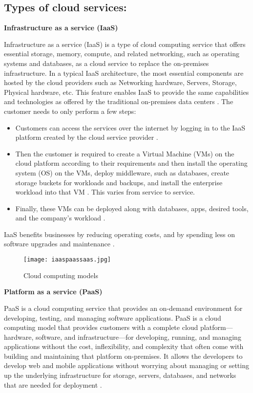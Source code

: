 \subsection{Types of cloud services:}
\textbf{Infrastructure as a service (IaaS)}
\par Infrastructure as a service (IaaS) is a type of cloud computing service that offers essential storage, memory, compute, and related networking, such as
operating systems and databases, as a cloud service to replace the on-premises infrastructure. In a typical IaaS
architecture, the most essential components are hosted by the cloud providers such as Networking hardware, Servers, Storage, Physical hardware, etc. This feature enables IaaS to provide the same capabilities and technologies as offered by the traditional on-premises data centers \cite{9}. The customer needs to only perform a few steps:
\begin{itemize}
    \item Customers can access the services over the internet by logging in to the IaaS platform created by the cloud
    service provider \cite{15}.
\end{itemize}
\begin{itemize}
    \item Then the customer is required to create a Virtual Machine (VMs) on the cloud platform according to their
    requirements and then install the operating system (OS) on the VMs, deploy middleware, such as databases, create
    storage buckets for workloads and backups, and install the enterprise workload into that VM \cite{15}. This
    varies from service to service.
\end{itemize}
\begin{itemize}
    \item Finally, these VMs can be deployed along with databases, apps, desired tools, and the company’s workload \cite{15}.
\end{itemize}
IaaS benefits businesses by reducing operating costs, and by spending less on software upgrades and maintenance
\cite{15}.

\begin{figure}
    \centering
    \texttt{[image: iaaspaassaas.jpg]}
    \caption{Cloud computing models}
    \label{fig:iaaspaassaas}
\end{figure}

\textbf{Platform as a service (PaaS)}
\par PaaS is a cloud computing service that provides an on-demand environment for developing, testing, and managing software applications. PaaS is a cloud computing model that provides customers with a complete cloud platform—hardware, software, and infrastructure—for developing, running, and managing applications without the cost, inflexibility, and complexity that often come with building and maintaining that platform on-premises. It allows the developers to develop web and mobile applications without worrying about managing or setting up the underlying infrastructure for storage, servers, databases, and networks that are needed for deployment \cite{15}.

